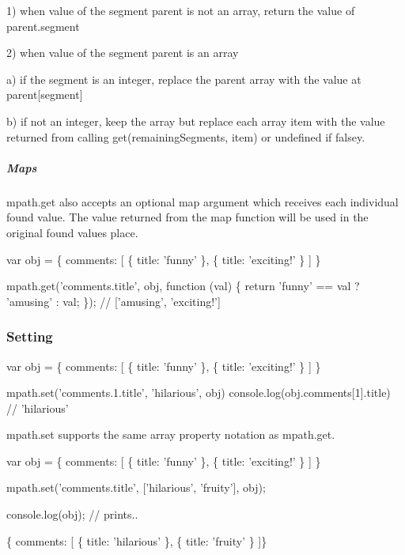 \begin{DoxyItemize}
\item 1) when value of the segment parent is not an array, return the value of {\ttfamily parent.\+segment}
\item 2) when value of the segment parent is an array
\begin{DoxyItemize}
\item a) if the segment is an integer, replace the parent array with the value at {\ttfamily parent\mbox{[}segment\mbox{]}}
\item b) if not an integer, keep the array but replace each array {\ttfamily item} with the value returned from calling {\ttfamily get(remaining\+Segments, item)} or undefined if falsey.
\end{DoxyItemize}
\end{DoxyItemize}

\subparagraph*{Maps}

{\ttfamily mpath.\+get} also accepts an optional {\ttfamily map} argument which receives each individual found value. The value returned from the {\ttfamily map} function will be used in the original found values place.


\begin{DoxyCode}
var obj = \{
    comments: [
      \{ title: 'funny' \},
      \{ title: 'exciting!' \}
    ]
\}

mpath.get('comments.title', obj, function (val) \{
  return 'funny' == val
    ? 'amusing'
    : val;
\});
// ['amusing', 'exciting!']
\end{DoxyCode}


\subsubsection*{Setting}


\begin{DoxyCode}
var obj = \{
    comments: [
      \{ title: 'funny' \},
      \{ title: 'exciting!' \}
    ]
\}

mpath.set('comments.1.title', 'hilarious', obj)
console.log(obj.comments[1].title) // 'hilarious'
\end{DoxyCode}


{\ttfamily mpath.\+set} supports the same array property notation as {\ttfamily mpath.\+get}.


\begin{DoxyCode}
var obj = \{
    comments: [
      \{ title: 'funny' \},
      \{ title: 'exciting!' \}
    ]
\}

mpath.set('comments.title', ['hilarious', 'fruity'], obj);

console.log(obj); // prints..

  \{ comments: [
      \{ title: 'hilarious' \},
      \{ title: 'fruity' \}
  ]\}
\end{DoxyCode}


